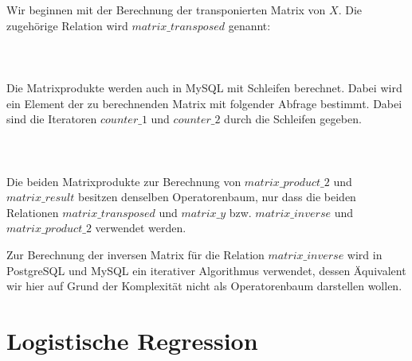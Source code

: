 Wir beginnen mit der Berechnung der transponierten Matrix von $X$. Die zugehörige Relation wird $matrix\_transposed$ genannt:
\\\\
\noindent{}
\\\\
Die Matrixprodukte werden auch in MySQL mit Schleifen berechnet. Dabei wird ein Element der zu berechnenden Matrix mit folgender Abfrage bestimmt. Dabei sind die Iteratoren $counter\_1$ und $counter\_2$ durch die Schleifen gegeben.
\\\\
\noindent{}
\\\\
Die beiden Matrixprodukte zur Berechnung von $matrix\_product\_2$ und $matrix\_result$ besitzen denselben Operatorenbaum, nur dass die beiden Relationen $matrix\_transposed$ und $matrix\_y$ bzw. $matrix\_inverse$ und $matrix\_product\_2$ verwendet werden.

Zur Berechnung der inversen Matrix für die Relation $matrix\_inverse$ wird in PostgreSQL und MySQL ein iterativer Algorithmus verwendet, dessen Äquivalent wir hier auf Grund der Komplexität nicht als Operatorenbaum darstellen wollen.

\section{Logistische Regression}
\label{section:5:3}

